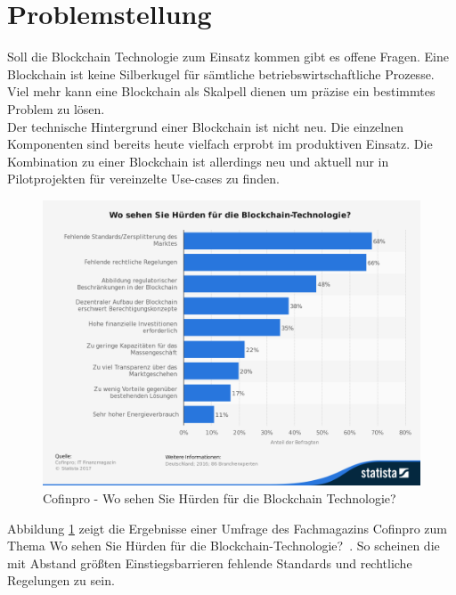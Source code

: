 \section{Problemstellung}

Soll die Blockchain Technologie zum Einsatz kommen gibt es offene Fragen. Eine Blockchain ist keine Silberkugel für sämtliche betriebswirtschaftliche Prozesse. Viel mehr kann eine Blockchain als Skalpell dienen um präzise ein bestimmtes Problem zu lösen.\\
Der technische Hintergrund einer Blockchain ist nicht neu. Die einzelnen Komponenten sind bereits heute vielfach erprobt im produktiven Einsatz.\cite{Diffie1976}\cite{Steinmetz2005} Die Kombination zu einer Blockchain ist allerdings neu und aktuell nur in Pilotprojekten für vereinzelte Use-cases zu finden.

\begin{figure}[h!]
	\centering
	\includegraphics[width=0.9\linewidth]{pictures/Statista-Huerden-Blockchain-2016}
	\caption[Statista Blockchain Umfrage]{Cofinpro - Wo sehen Sie Hürden für die Blockchain Technologie?\cite{Cofinpro}}
	\label{fig:statista-huerden-blockchain-2016}
\end{figure}

Abbildung \ref{fig:statista-huerden-blockchain-2016} zeigt die Ergebnisse einer Umfrage des Fachmagazins Cofinpro zum Thema \glqq Wo sehen Sie Hürden für die Blockchain-Technologie?\grqq~. So scheinen die mit Abstand größten Einstiegsbarrieren fehlende Standards und rechtliche Regelungen zu sein.

%

